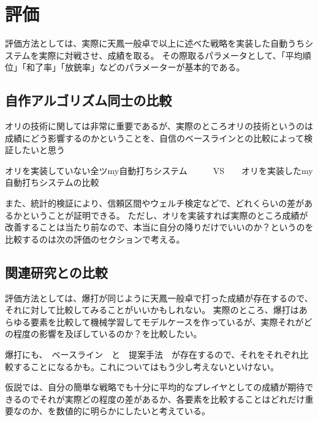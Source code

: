 \chapter{評価}
\label{chap:conclusion}

評価方法としては、実際に天鳳一般卓で以上に述べた戦略を実装した自動うちシステムを実際に対戦させ、成績を取る。
その際取るパラメータとして、「平均順位」「和了率」「放銃率」などのパラメーターが基本的である。


\section{自作アルゴリズム同士の比較}


オリの技術に関しては非常に重要であるが、実際のところオリの技術というのは成績にどう影響するのかということを、自信のベースラインとの比較によって検証したいと思う

オリを実装していない全ツmy自動打ちシステム　　　VS　　オリを実装したmy自動打ちシステムの比較　


また、統計的検証により、信頼区間やウェルチ検定などで、どれくらいの差があるかということが証明できる。
ただし、オリを実装すれば実際のところ成績が改善することは当たり前なので、本当に自分の降りだけでいいのか？というのを比較するのは次の評価のセクションで考える。

\section{関連研究との比較}

評価方法としては、爆打が同じように天鳳一般卓で打った成績が存在するので、それに対して比較してみることがいいかもしれない。
実際のところ、爆打はあらゆる要素を比較して機械学習してモデルケースを作っているが、実際それがどの程度の影響を及ぼしているのか？を比較したい。

爆打にも、　ベースライン　と　提案手法　が存在するので、それをそれぞれ比較することになるかも。これについてはもう少し考えないといけない。

仮説では、自分の簡単な戦略でも十分に平均的なプレイヤとしての成績が期待できるのでそれが実際どの程度の差があるか、各要素を比較することはどれだけ重要なのか、を数値的に明らかにしたいと考えている。



